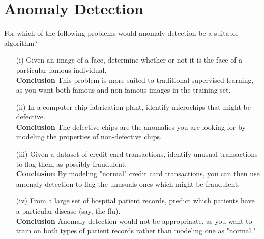 \documentclass[]{article}
\begin{document}
\section*{Anomaly Detection}

For which of the following problems would anomaly detection be a suitable algorithm?
\begin{itemize}
\item[(i)]
Given an image of a face, determine whether or not it is the face of a particular famous individual.\\	\textbf{Conclusion} This problem is more suited to traditional supervised learning, as you want both famous and non-famous images in the training set.
\item[(ii)]
In a computer chip fabrication plant, identify microchips that might be defective.	\\	\textbf{Conclusion} 	The defective chips are the anomalies you are looking for by modeling the properties of non-defective chips.
\item[(iii)]
Given a dataset of credit card transactions, identify unusual transactions to flag them as possibly fraudulent.	\\	\textbf{Conclusion} By modeling "normal" credit card transactions, you can then use anomaly detection to flag the unusuals ones which might be fraudulent.
\item[(iv)]
From a large set of hospital patient records, predict which patients have a particular disease (say, the flu).\\	\textbf{Conclusion} Anomaly detection would not be appropriaate, as you want to train on both types of patient records rather than modeling one as "normal."
\end{itemize}
\end{document}
